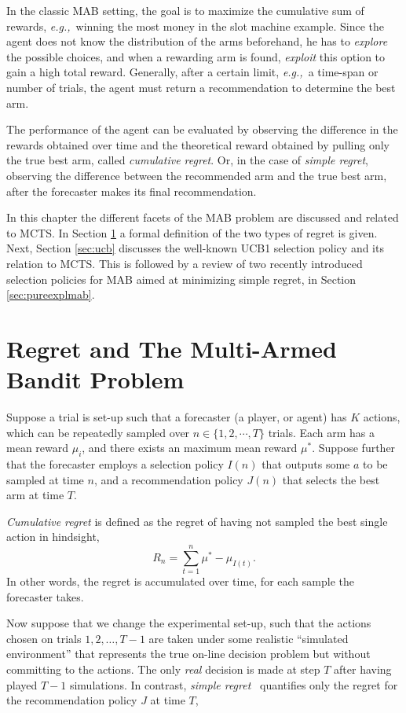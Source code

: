 \documentclass{kecsmstr}
\newcommand{\eg}{{\it e.g.,}~}
\begin{document}
In the classic MAB setting, the goal is to maximize the cumulative sum of rewards, \eg winning the most money in the slot machine example. Since the agent does not know the distribution of the arms beforehand, he has to \emph{explore} the possible choices, and when a rewarding arm is found, \emph{exploit} this option to gain a high total reward. Generally, after a certain limit, \eg a time-span or number of trials, the agent must return a recommendation to determine the best arm.

The performance of the agent can be evaluated by observing the difference in the rewards obtained over time and the theoretical reward obtained by pulling only the true best arm, called \emph{cumulative regret}. Or, in the case of \emph{simple regret}, observing the difference between the recommended arm and the true best arm, after the forecaster makes its final recommendation.
\vspace{2 mm}

In this chapter the different facets of the MAB problem are discussed and related to MCTS. In Section \ref{sec:mabprob} a formal definition of the two types of regret is given. Next, Section \ref{sec:ucb} discusses the well-known UCB1 selection policy and its relation to MCTS. This is followed by a review of two recently introduced selection policies for MAB aimed at minimizing simple regret, in Section \ref{sec:pureexplmab}.

\section{Regret and The Multi-Armed Bandit Problem}
\label{sec:mabprob}
Suppose a trial is set-up such that a forecaster (a player, or agent) has $K$ actions, which can be repeatedly sampled over $n \in \{ 1, 2, \cdots, T \}$ trials. Each arm has a mean reward $\mu_i$, and there exists an maximum mean reward $\mu^*$. Suppose further that the forecaster employs a selection policy $I(n)$ that outputs some $a$ to be sampled at time $n$, and a recommendation policy $J(n)$ that selects the best arm at time $T$.

\emph{Cumulative regret} is defined as the regret of having not sampled the best single action in hindsight, 
\begin{equation}
R_n = \sum_{t = 1}^{n}{\mu^* - \mu_{I(t)}}.
\end{equation}
In other words, the regret is accumulated over time, for each sample the forecaster takes.

Now suppose that we change the experimental set-up, such that the actions chosen on trials $1, 2, \ldots, T-1$ are taken under some realistic ``simulated environment'' that represents the true on-line decision problem but without committing to the actions. The only \emph{real} decision is made at step $T$ after having played $T-1$ simulations. In contrast, \emph{simple regret}~ quantifies only the regret for the recommendation policy $J$ at time $T$,
\end{document}
